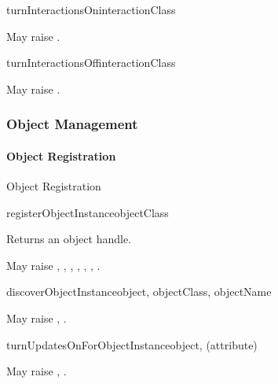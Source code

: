 \begin{methoddesc}{turnInteractionsOn}{interactionClass}

May raise
.
\end{methoddesc}

\begin{methoddesc}{turnInteractionsOff}{interactionClass}

May raise
.
\end{methoddesc}

\subsubsection{Object Management}

\paragraph{Object Registration}

\begin{hlamsc}{Object Registration}

\nextlevel
{}
\nextlevel
{}
\nextlevel
{}
\nextlevel[3]
\nextlevel
{}
\nextlevel
\end{hlamsc}

\begin{methoddesc}{registerObjectInstance}{objectClass}

Returns an object handle.

May raise
,
,
,
,
,
,
.
\end{methoddesc}

\begin{methoddesc}{discoverObjectInstance}{object, objectClass, objectName}

May raise
,
.
\end{methoddesc}

\begin{methoddesc}{turnUpdatesOnForObjectInstance}{object, (attribute)}

May raise
,
.
\end{methoddesc}

